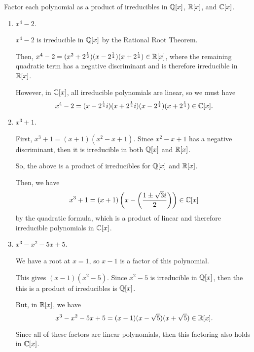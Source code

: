 \documentclass[../hw6]{subfiles}
\begin{document}
\begin{problem}
Factor each polynomial as a product of irreducibles in $\mathbb{Q}[x]$, $\mathbb{R}[x]$, and $\mathbb{C}[x]$.
\end{problem}
\begin{enumerate}[label=\alph*]
	\item $x^4-2$.

	      $x^4-2$ is irreducible in  $\mathbb{Q}[x]$ by the Rational Root Theorem.

	      Then, $x^4-2=(x^2+2^{\frac{1}{2}})(x-2^{\frac{1}{4}})(x+2^{\frac{1}{4}}) \in \mathbb{R}[x]$,
	      where the remaining quadratic term has a negative discriminant and is therefore irreducible in $\mathbb{R}[x]$.

	      However, in $\mathbb{C}[x]$, all irreducible polynomials are linear, so we must have \[
		      x^4-2=(x-2^{\frac{1}{4}}i)(x+2^{\frac{1}{4}}i)(x-2^{\frac{1}{4}})(x+2^{\frac{1}{4}}) \in  \mathbb{C}[x]
		      .\]

	\item $x^3+1$.

	      First, $x^3+1=(x+1)(x^2-x+1)$. Since $x^2-x+1$ has a negative discriminant, then it is irreducible in both $\mathbb{Q}[x]$ and $\mathbb{R}[x]$.

	      So, the above is a product of irreducibles for $\mathbb{Q}[x]$ and $\mathbb{R}[x]$.

	      Then, we have \[
		      x^3+1 = (x+1)\left( x- \left( \frac{1 \pm \sqrt{3}i }{2} \right)  \right) \in \mathbb{C}[x]
	      \] by the quadratic formula, which is a product of linear and therefore irreducible polynomials in $\mathbb{C}[x]$.

	\item $x^3 - x^2 - 5x + 5$.

	      We have a root at $x=1$, so  $x-1$ is a factor of this polynomial.

	      This gives $(x-1)(x^2-5)$.
	      Since $x^2-5$ is irreducible in $\mathbb{Q}[x]$, then the this is a product of irreducibles is  $\mathbb{Q}[x]$.

	      But, in $\mathbb{R}[x]$, we have \[
		      x^3 - x^2  - 5x + 5 = (x-1)(x-\sqrt{5} )(x + \sqrt{5} )\in \mathbb{R}[x]
		      .\]

	      Since all of these factors are linear polynomials, then this factoring also holds in $\mathbb{C}[x]$.
\end{enumerate}
\end{document}
